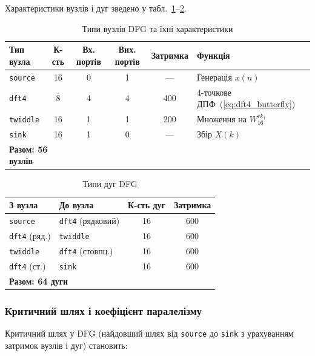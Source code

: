 Характеристики вузлів і дуг зведено у
табл.~\ref{tab:nodes}--\ref{tab:edges}.

\begin{table}[H]
  \caption{Типи вузлів DFG та їхні характеристики}
  \label{tab:nodes}
  \centering
  \small
  \begin{tabular}{lccccl}
    \toprule
    Тип вузла & К-сть & Вх. портів & Вих. портів & Затримка & Функція \\
    \midrule
    \texttt{source}  & 16 & 0 & 1 & ---  & Генерація $x(n)$ \\
    \texttt{dft4}    &  8 & 4 & 4 & 400  & 4-точкове ДПФ~(\ref{eq:dft4_butterfly}) \\
    \texttt{twiddle} & 16 & 1 & 1 & 200  & Множення на $W_{16}^{r k_1}$ \\
    \texttt{sink}    & 16 & 1 & 0 & ---  & Збір $X(k)$ \\
    \midrule
    \multicolumn{2}{l}{\textbf{Разом: 56 вузлів}} & & & & \\
    \bottomrule
  \end{tabular}
\end{table}

\begin{table}[H]
  \caption{Типи дуг DFG}
  \label{tab:edges}
  \centering
  \small
  \begin{tabular}{llcc}
    \toprule
    З вузла & До вузла & К-сть дуг & Затримка \\
    \midrule
    \texttt{source}      & \texttt{dft4} (рядковий)  & 16 & 600 \\
    \texttt{dft4} (ряд.) & \texttt{twiddle}          & 16 & 600 \\
    \texttt{twiddle}     & \texttt{dft4} (стовпц.)   & 16 & 600 \\
    \texttt{dft4} (ст.)  & \texttt{sink}             & 16 & 600 \\
    \midrule
    \multicolumn{2}{l}{\textbf{Разом: 64 дуги}} & & \\
    \bottomrule
  \end{tabular}
\end{table}

\subsubsection*{Критичний шлях і коефіцієнт паралелізму}

Критичний шлях у DFG (найдовший шлях від \texttt{source} до
\texttt{sink} з урахуванням затримок вузлів і дуг) становить:

